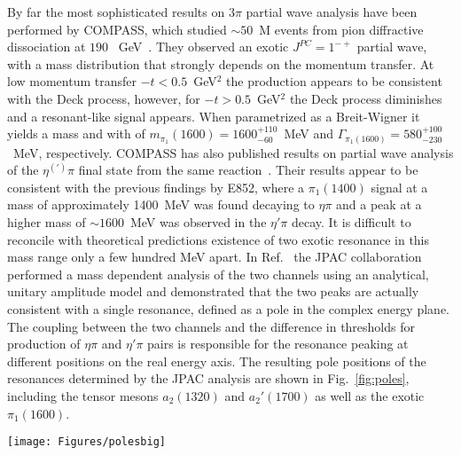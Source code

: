 By far the most sophisticated results on $3\pi$ partial wave analysis have been performed by COMPASS, which studied $\sim 50$~M  events from pion diffractive dissociation at $190$~ GeV~\cite{COMPASS:2018uzl,Ketzer:2019wmd}. They observed an exotic $J^{PC}=1^{-+}$ partial wave, with a mass distribution that strongly depends on the momentum transfer. At low momentum transfer $-t< 0.5$~GeV$^2$ the production appears to be consistent with the Deck process, however, for $-t> 0.5$~GeV$^2$ the Deck process diminishes and a resonant-like signal appears. When parametrized as a Breit-Wigner it yields a mass and with of $m_{\pi_1}(1600) =1600^{+110}_{-60}$~MeV and  $\Gamma_{\pi_1(1600)} = 580^{+100}_{-230}$~MeV, respectively. COMPASS has also published results on partial wave analysis of the $\eta^{(')}\pi$ final state from the same reaction~\cite{COMPASS:2014vkj}.
Their results appear to be consistent with the previous findings by E852, where a $\pi_1(1400)$ signal at a mass of approximately 1400~MeV was found decaying to $\eta\pi$ and a peak at a higher mass of $\sim 1600$~MeV was observed in the $\eta'\pi$ decay. It is difficult to reconcile with theoretical predictions existence of two exotic resonance in this mass range only a few hundred MeV apart. In Ref.~\cite{Rodas:2018owy} the JPAC collaboration performed a mass dependent analysis of the two channels using an analytical, unitary amplitude model and demonstrated that the two peaks are actually consistent with a single resonance, defined as a pole in the complex energy plane. The coupling between the two channels and the difference in thresholds for production of $\eta\pi$ and $\eta'\pi$ pairs is responsible for the resonance peaking at different positions on the real energy axis.  The resulting pole positions of the resonances determined by the JPAC analysis are shown in Fig.~\ref{fig:poles}, including the tensor mesons $a_2(1320)$ and $a_2'(1700)$ as well as the exotic $\pi_1(1600)$.

\begin{figure*}
\texttt{[image: Figures/polesbig]}
\caption{\label{fig:poles} Positions of the poles identified as the $a_2(1320)$, $\pi_1$, and $a_2'(1700)$. The inset shows the position of the $a_2(1320)$. The green and yellow ellipses show the $1\sigma$ and $2\sigma$ confidence levels, respectively. The gray ellipses in the background show, 
 within $2\sigma$, variation of the pole position  upon changing the functional form and the parameters of the model, as discussed in the text
 }
\end{figure*}


